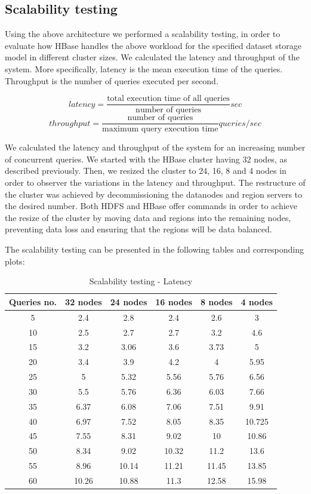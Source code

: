 \subsection{Scalability testing}

Using the above architecture we performed a scalability testing, in order to evaluate how HBase handles the above workload for the specified dataset storage model 
in different cluster sizes. We calculated the latency and throughput of the system. More specifically, latency is the mean 
execution time of the queries. Throughput is the number of queries executed per second. 

\[latency = \frac{\text{total execution time of all queries}}{\text{number of queries}} sec\]
\[throughput = \frac{\text{number of queries}}{\text{maximum query execution time}} queries/sec\]

We calculated the latency and throughput of the system for an increasing number of concurrent queries. We started with the HBase cluster having 32 nodes, as 
described previously. Then, we resized the cluster to 24, 16, 8 and 4 nodes in order to observer the variations in the latency and throughput. 
The restructure of the cluster was achieved by decommissioning the datanodes and region servers to the desired number. Both HDFS and HBase offer 
commands in order to achieve the resize of the cluster by moving data and regions into the remaining nodes, preventing data loss and ensuring that the 
regions will be data balanced. 

The scalability testing can be presented in the following tables and corresponding plots:

\begin{table}[H]
\begin{center}
\begin{tabular}{|c|c|c|c|c|c|}
\hline
Queries no. & 32 nodes & 24 nodes & 16 nodes & 8 nodes & 4 nodes \\ \hline
5 & 2.4   & 2.8    & 2.4   & 2.6   & 3\\ \hline
10 & 2.5  & 2.7    & 2.7   & 3.2   & 4.6\\ \hline
15 & 3.2  & 3.06   & 3.6   & 3.73  & 5\\ \hline
20 & 3.4  & 3.9    & 4.2   & 4     & 5.95\\ \hline
25 & 5    & 5.32   & 5.56  & 5.76  & 6.56\\ \hline
30 & 5.5  & 5.76   & 6.36  & 6.03  & 7.66\\ \hline
35 & 6.37 & 6.08   & 7.06  & 7.51  & 9.91 \\ \hline
40 & 6.97 & 7.52   & 8.05  & 8.35  & 10.725 \\ \hline
45 & 7.55 & 8.31   & 9.02  & 10    & 10.86 \\ \hline
50 & 8.34 & 9.02   & 10.32 & 11.2  & 13.6 \\ \hline
55 & 8.96 & 10.14  & 11.21 & 11.45 & 13.85 \\ \hline
60 & 10.26 & 10.88 & 11.3  & 12.58 & 15.98 \\ \hline
\end{tabular}
\end{center}
\caption{Scalability testing - Latency}
\end{table}


